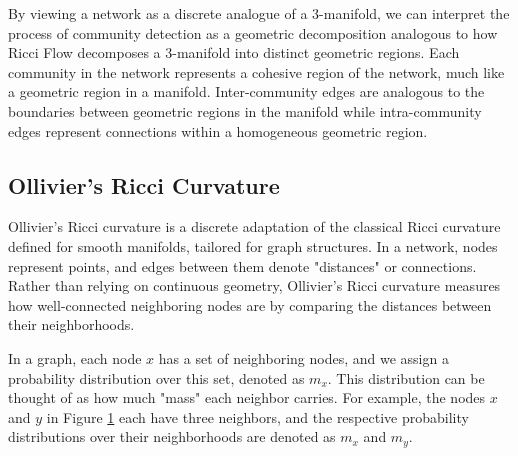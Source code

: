 \documentclass[12pt,a4paper]{article}
\begin{document}
By viewing a network as a discrete analogue of a 3-manifold, we can interpret the process of community detection as a geometric decomposition analogous to how Ricci Flow decomposes a 3-manifold into distinct geometric regions. Each community in the network represents a cohesive region of the network, much like a geometric region in a manifold. 
Inter-community edges are analogous to the boundaries between geometric regions in the manifold while intra-community edges represent connections within a homogeneous geometric region.


\subsection{Ollivier's Ricci Curvature}

Ollivier's Ricci curvature is a discrete adaptation of the classical Ricci curvature defined for smooth manifolds, tailored for graph structures. In a network, nodes represent points, and edges between them denote "distances" or connections. Rather than relying on continuous geometry, Ollivier's Ricci curvature measures how well-connected neighboring nodes are by comparing the distances between their neighborhoods.

In a graph, each node $x$ has a set of neighboring nodes, and we assign a probability distribution over this set, denoted as $m_x$. This distribution can be thought of as how much "mass" each neighbor carries. For example, the nodes $x$ and $y$ in Figure \hyperref[fig1]{1} each have three neighbors, and the respective probability distributions over their neighborhoods are denoted as $m_x$ and $m_y$.
\end{document}
